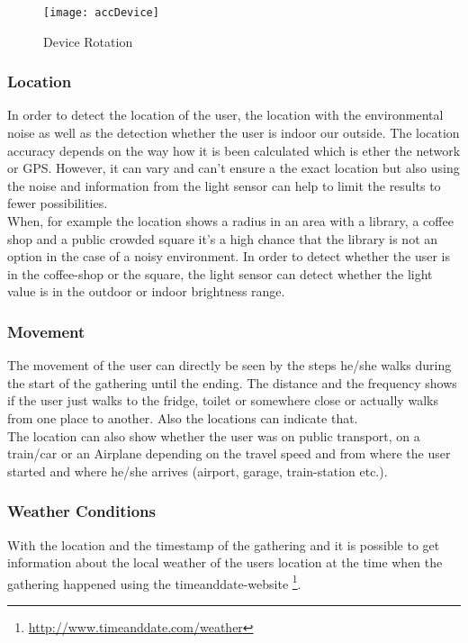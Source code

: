 {\begin{figure}[!htb]
\centering
\texttt{[image: accDevice]}
\caption{Device Rotation}\label{accDev}
\vspace{10 mm}
\end{figure}
\FloatBarrier

\subsubsection{Location}
In order to detect the location of the user, the location with the environmental noise as well as the detection whether the user is indoor our outside. The location accuracy depends on the way how it is been calculated which is ether the network or GPS. However, it can vary and can't ensure a the exact location but also using the noise and information from the light sensor can help to limit the results to fewer possibilities.\\
When, for example the location shows a radius in an area with a library, a coffee shop and a public crowded square it's a high chance that the library is not an option in the case of a noisy environment. In order to detect whether the user is in the coffee-shop or the square, the light sensor can detect whether the light value is in the outdoor or indoor brightness range. 

\subsubsection{Movement}
The movement of the user can directly be seen by the steps he/she walks during the start of the gathering until the ending. The distance and the frequency shows if the user just walks to the fridge, toilet or somewhere close or actually walks from one place to another. Also the locations can indicate that.\\
The location can also show whether the user was on public transport, on a train/car or an Airplane depending on the travel speed and from where the user started and where he/she arrives (airport, garage, train-station etc.). 

\subsubsection{Weather Conditions}
With the location and the timestamp of the gathering and it is possible to get information about the local weather of the users location at the time when the gathering happened using the timeanddate-website \footnote{\url{http://www.timeanddate.com/weather}}.

}
